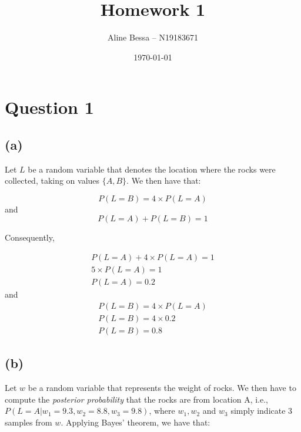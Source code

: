 \documentclass{article}
\title{Homework 1}
\author{Aline Bessa -- N19183671}
\date\today
\begin{document}
\maketitle %

\section*{Question 1}

\subsection*{(a)}

Let $L$ be a random variable that denotes the location where the rocks were collected, taking on values $\{A, B\}$. We then have that:

\begin{equation*}
P(L = B) = 4 \times P(L = A)
\end{equation*}
and
\begin{equation*}
P(L = A) + P(L = B) = 1 
\end{equation*}

Consequently, 

\begin{equation*}
\begin{split}
P(L = A) + 4 \times P(L = A) = 1
\\
5 \times P(L = A) = 1
\\
P(L = A) = 0.2
\end{split}
\end{equation*}
and
\begin{equation*}
\begin{split}
P(L = B) = 4 \times P(L = A) 
\\
P(L = B) = 4 \times 0.2 
\\
P(L = B) = 0.8
\end{split}
\end{equation*}

\subsection*{(b)} 

Let $w$ be a random variable that represents the weight of rocks. We then have to compute the \textit{posterior probability} that the rocks are from 
location A, i.e., $P(L = A| w_1 = 9.3, w_2 = 8.8, w_3 = 9.8)$, where $w_1, w_2$ and $w_3$ simply indicate 3 samples from $w$. Applying Bayes' theorem, we have that:
\end{document}
